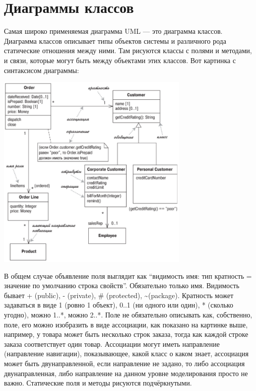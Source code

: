 \documentclass[a5paper]{article}
\begin{document}
\section{Диаграммы классов}

Самая широко применяемая диаграмма UML --- это диаграмма классов. Диаграмма классов описывает типы объектов системы и различного рода статические отношения между ними. Там рисуются классы с полями и методами, и связи, которые могут быть между объектами этих классов. Вот картинка с синтаксисом диаграммы:

\begin{center}
	\includegraphics[width=0.7\textwidth]{umlClassDiagram.png}
\end{center}

В общем случае объявление поля выглядит как ``видимость имя: тип кратность = значение по умолчанию {строка свойств}''. Обязательно только имя. Видимость бывает + (public), - (private), \# (protected), \textasciitilde (package). Кратность может задаваться в виде 1 (ровно 1 объект), 0..1 (ни одного или один), * (сколько угодно), можно 1..*, можно 2..*. Поле не обязательно описывать как, собственно, поле, его можно изобразить в виде ассоциации, как показано на картинке выше, например, у товара может быть несколько строк заказа, тогда как каждой строке заказа соответствует один товар. Ассоциации могут иметь направление (направление навигации), показывающее, какой класс о каком знает, ассоциация может быть двунаправленной, если направление не задано, то либо ассоциация двунаправленная, либо направление на данном уровне моделирования просто не важно. Статические поля и методы рисуются подчёркнутыми.
\end{document}
